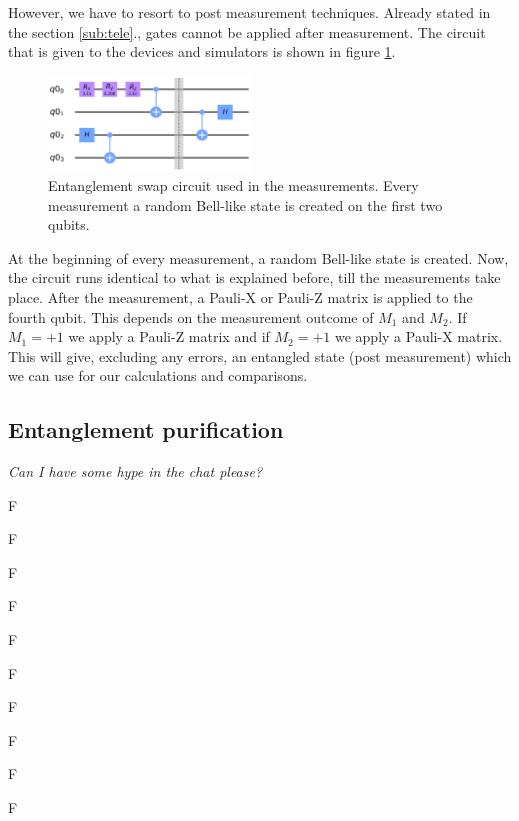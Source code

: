 However, we have to resort to post measurement techniques. Already stated in the section \ref{sub:tele}., gates cannot be applied after measurement. The circuit that is given to the devices and simulators is shown in figure \ref{fig:swapcir}.
\begin{figure}[h]
	\includegraphics[width=0.48\textwidth]{images/swap_circuit.png}
	\caption{Entanglement swap circuit used in the measurements. Every measurement a random Bell-like state is created on the first two qubits.}
	\label{fig:swapcir}
\end{figure}
At the beginning of every measurement, a random Bell-like state is created. Now, the circuit runs identical to what is explained before, till the measurements take place. After the measurement, a Pauli-X or Pauli-Z matrix is applied to the fourth qubit. This depends on the measurement outcome of $M_1$ and $M_2$. If $M_1 = +1$ we apply a Pauli-Z matrix and if $M_2 = +1$ we apply a Pauli-X matrix. This will give, excluding any errors, an entangled state (post measurement) which we can use for our calculations and comparisons.

\subsection{Entanglement purification}
\emph{Can I have some hype in the chat please?}

F

F

F

F

F

F

F

F

F

F